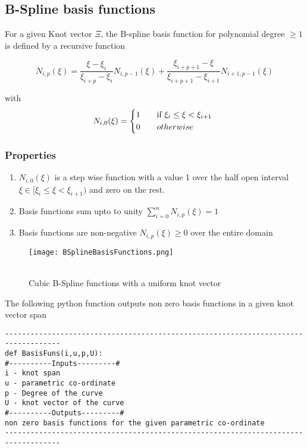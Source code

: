 \documentclass[11pt]{article}
\begin{document}
\subsection{B-Spline basis functions }

For a given Knot vector $\Xi$, the B-spline basis function for polynomial degree
$\geq 1$ is defined by a recursive function \cite{piegl2012nurbs}

\begin{equation}
N_{i,p}(\xi) = \frac{\xi-\xi_{i}}{\xi_{i+p}-\xi_{i}} N_{i,p-1}(\xi) + 
\frac{\xi_{i+p+1}-\xi}{\xi_{i+p+1}-\xi_{i+1}} N_{i+1,p-1}(\xi)
\end{equation}

\noindent
with
\begin{equation}
N_{i,0}(\xi) = 
\begin{cases*}
1 \quad& if $  \xi_{i} \leq \xi<\xi_{i+1} $ \\
0 &  $ otherwise $ \\
\end{cases*}
\end{equation}

\subsubsection{Properties }
\begin{enumerate}
	\item $ N_{i,0}(\xi)$ is a step wise function with a value 1 over the half open
	interval $ \xi \in [\xi_{i}  \leq \xi<\xi_{i+1}) $ and zero on the rest.
	\item Basis functions sum upto to unity $\sum_{i=0}^{n} N_{i,p}(\xi) =1$
	\item Basis functions are non-negative $ N_{i,p}(\xi) \geq 0$ over the entire
	domain
\end{enumerate}

\begin{figure}[H]
	\begin{center}
		\texttt{[image: BSplineBasisFunctions.png]}
		\caption{\\Cubic B-Spline functions with a uniform knot vector \cite{piegl2012nurbs}   }\label{BSplineBasisFunctions}
	\end{center}	
\end{figure}
\noindent
The following python function outputs non zero basis functions in a given knot vector span
\begin{verbatim}
-----------------------------------------------------------------------------------
def BasisFuns(i,u,p,U):
#----------Inputs---------#
i - knot span
u - parametric co-ordinate
p - Degree of the curve
U - knot vector of the curve
#----------Outputs---------#
non zero basis functions for the given parametric co-ordinate
-----------------------------------------------------------------------------------
\end{verbatim}
\end{document}
